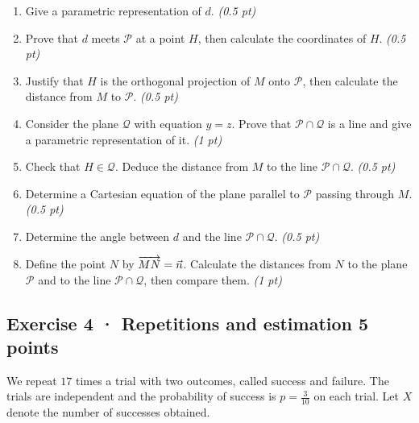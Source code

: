 \begin{enumerate}

\item Give a parametric representation of $d$. \hfill\textit{(0.5 pt)}

\item Prove that $d$ meets $\mathcal P$ at a point $H$, then calculate the coordinates of $H$. \hfill\textit{(0.5 pt)}

\item Justify that $H$ is the orthogonal projection of $M$ onto $\mathcal P$, then calculate the distance from $M$ to $\mathcal P$. \hfill\textit{(0.5 pt)}

\item Consider the plane $\mathcal Q$ with equation $y=z$. Prove that $\mathcal P\cap\mathcal Q$ is a line and give a parametric representation of it. \hfill\textit{(1 pt)}

\item Check that $H\in\mathcal Q$. Deduce the distance from $M$ to the line $\mathcal P\cap\mathcal Q$. \hfill\textit{(0.5 pt)}

\item Determine a Cartesian equation of the plane parallel to $\mathcal P$ passing through $M$. \hfill\textit{(0.5 pt)}

\item Determine the angle between $d$ and the line $\mathcal P\cap\mathcal Q$. \hfill\textit{(0.5 pt)}

\item Define the point $N$ by $\overrightarrow{MN}=\vec n$. Calculate the distances from $N$ to the plane $\mathcal P$ and to the line $\mathcal P\cap\mathcal Q$, then compare them. \hfill\textit{(1 pt)}

\end{enumerate}

\subsection*{Exercise 4 · Repetitions and estimation \hfill 5 points}We repeat $17$ times a trial with two outcomes, called success and failure. The trials are independent and the probability of success is $p=\frac{3}{10}$ on each trial. Let $X$ denote the number of successes obtained.

